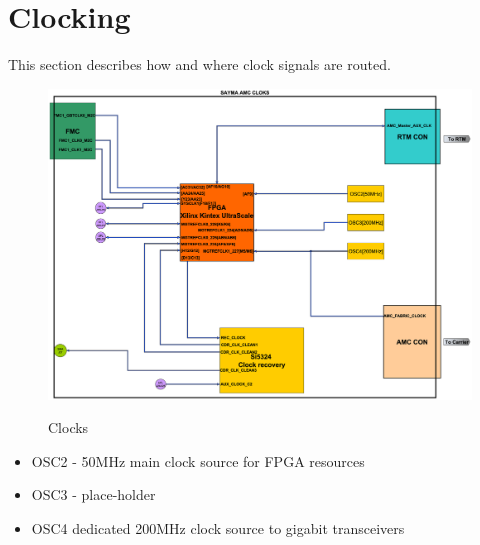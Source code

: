 \section{Clocking}

This section describes how and where clock signals are routed.

	\begin{figure}[htbp!]
		\centering
		\includegraphics[scale=0.2]{img/clk.eps}\\
		\caption{Clocks} \label{clocking}
	\end{figure}
\begin{itemize}
	\item OSC2 - 50MHz main clock source for FPGA resources
	\item OSC3 - place-holder
	\item OSC4 dedicated 200MHz clock source to gigabit transceivers
\end{itemize}